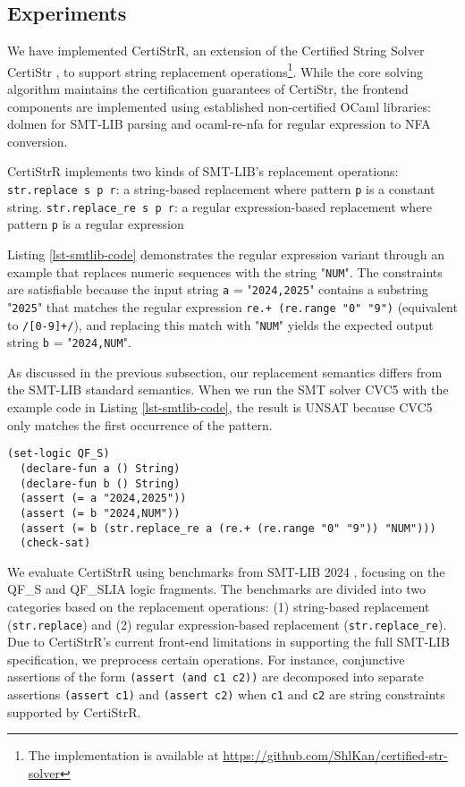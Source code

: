 \documentclass[a4paper,UKenglish,cleveref, autoref, anonymous, thm-restate]{lipics-v2021}
\begin{document}
\subsection{Experiments}

We have implemented CertiStrR, an extension of the Certified String Solver CertiStr \cite{cpp/KanLRS22}, to support string replacement operations\footnote{The implementation is available at \url{https://github.com/ShlKan/certified-str-solver}}. While the core solving algorithm maintains the certification guarantees of CertiStr, the frontend components are implemented using established non-certified  OCaml libraries: dolmen \cite{dolmen} for SMT-LIB parsing and ocaml-re-nfa \cite{ocaml-re-nfa} for regular expression to NFA conversion. 

CertiStrR implements two kinds of SMT-LIB's replacement operations:
\texttt{str.replace s p r}: a string-based replacement where pattern \texttt{p} is a constant string. \texttt{str.replace\_re s p r}: a regular expression-based replacement where pattern \texttt{p} is a regular expression

Listing \ref{lst-smtlib-code} demonstrates the regular expression variant through an example that replaces numeric sequences with the string "\texttt{NUM}". The constraints are satisfiable because the input string \texttt{a} = "\texttt{2024,2025}" contains a substring "\texttt{2025}" that matches the regular expression \texttt{re.+ (re.range "0" "9")} (equivalent to \texttt{/[0-9]+/}), and replacing this match with "\texttt{NUM}" yields the expected output string \texttt{b} = "\texttt{2024,NUM}".
%

As discussed in the previous subsection, our replacement semantics differs from the SMT-LIB standard semantics.
When we run the SMT solver CVC5 \cite{cvc5} with the example code in Listing \ref{lst-smtlib-code}, the result is UNSAT because CVC5 only matches the first occurrence of the pattern.


\begin{lstlisting}[language=SMTLIB, caption={Example SMT-LIB Code}, label={lst-smtlib-code}]
  (set-logic QF_S)
  (declare-fun a () String)
  (declare-fun b () String)
  (assert (= a "2024,2025"))
  (assert (= b "2024,NUM"))
  (assert (= b (str.replace_re a (re.+ (re.range "0" "9")) "NUM")))
  (check-sat)
  \end{lstlisting}


  We evaluate CertiStrR using benchmarks from SMT-LIB 2024 \cite{smtlib_benchmarks}, focusing on the QF\_S and QF\_SLIA logic fragments. The benchmarks are divided into two categories based on the replacement operations: (1) string-based replacement (\texttt{str.replace}) and (2) regular expression-based replacement (\texttt{str.replace\_re}). Due to CertiStrR's current front-end limitations in supporting the full SMT-LIB specification, we preprocess certain operations. For instance, conjunctive assertions of the form \texttt{(assert (and c1 c2))} are decomposed into separate assertions \texttt{(assert c1)} and \texttt{(assert c2)} when \texttt{c1} and \texttt{c2} are string constraints supported by CertiStrR.
\end{document}
